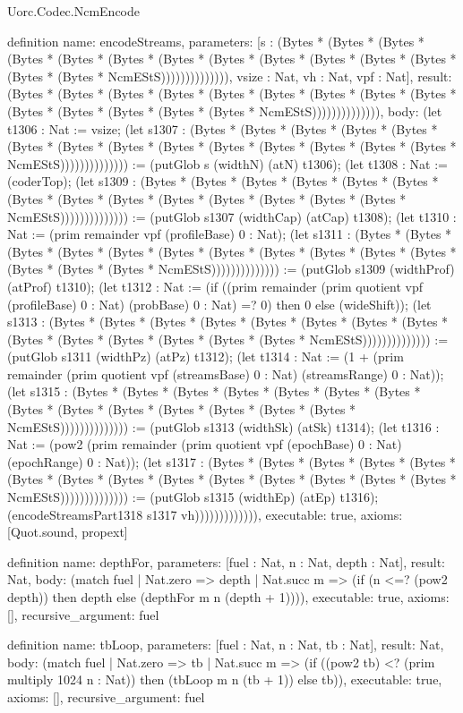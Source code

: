 \begin{lexlean}{Uorc.Codec.NcmEncode}
\begin{semanticmodule}
definition{
  name: encodeStreams,
  parameters: [s : (Bytes * (Bytes * (Bytes * (Bytes * (Bytes * (Bytes * (Bytes * (Bytes * (Bytes * (Bytes * (Bytes * (Bytes * (Bytes * (Bytes * NcmEStS)))))))))))))), vsize : Nat, vh : Nat, vpf : Nat],
  result: (Bytes * (Bytes * (Bytes * (Bytes * (Bytes * (Bytes * (Bytes * (Bytes * (Bytes * (Bytes * (Bytes * (Bytes * (Bytes * (Bytes * NcmEStS)))))))))))))),
  body: (let t1306 : Nat := vsize; (let s1307 : (Bytes * (Bytes * (Bytes * (Bytes * (Bytes * (Bytes * (Bytes * (Bytes * (Bytes * (Bytes * (Bytes * (Bytes * (Bytes * (Bytes * NcmEStS)))))))))))))) := (putGlob s (widthN) (atN) t1306); (let t1308 : Nat := (coderTop); (let s1309 : (Bytes * (Bytes * (Bytes * (Bytes * (Bytes * (Bytes * (Bytes * (Bytes * (Bytes * (Bytes * (Bytes * (Bytes * (Bytes * (Bytes * NcmEStS)))))))))))))) := (putGlob s1307 (widthCap) (atCap) t1308); (let t1310 : Nat := (prim remainder vpf (profileBase) 0 : Nat); (let s1311 : (Bytes * (Bytes * (Bytes * (Bytes * (Bytes * (Bytes * (Bytes * (Bytes * (Bytes * (Bytes * (Bytes * (Bytes * (Bytes * (Bytes * NcmEStS)))))))))))))) := (putGlob s1309 (widthProf) (atProf) t1310); (let t1312 : Nat := (if ((prim remainder (prim quotient vpf (profileBase) 0 : Nat) (probBase) 0 : Nat) =? 0) then 0 else (wideShift)); (let s1313 : (Bytes * (Bytes * (Bytes * (Bytes * (Bytes * (Bytes * (Bytes * (Bytes * (Bytes * (Bytes * (Bytes * (Bytes * (Bytes * (Bytes * NcmEStS)))))))))))))) := (putGlob s1311 (widthPz) (atPz) t1312); (let t1314 : Nat := (1 + (prim remainder (prim quotient vpf (streamsBase) 0 : Nat) (streamsRange) 0 : Nat)); (let s1315 : (Bytes * (Bytes * (Bytes * (Bytes * (Bytes * (Bytes * (Bytes * (Bytes * (Bytes * (Bytes * (Bytes * (Bytes * (Bytes * (Bytes * NcmEStS)))))))))))))) := (putGlob s1313 (widthSk) (atSk) t1314); (let t1316 : Nat := (pow2 (prim remainder (prim quotient vpf (epochBase) 0 : Nat) (epochRange) 0 : Nat)); (let s1317 : (Bytes * (Bytes * (Bytes * (Bytes * (Bytes * (Bytes * (Bytes * (Bytes * (Bytes * (Bytes * (Bytes * (Bytes * (Bytes * (Bytes * NcmEStS)))))))))))))) := (putGlob s1315 (widthEp) (atEp) t1316); (encodeStreamsPart1318 s1317 vh))))))))))))),
  executable: true,
  axioms: [Quot.sound, propext]
}

definition{
  name: depthFor,
  parameters: [fuel : Nat, n : Nat, depth : Nat],
  result: Nat,
  body: (match fuel
    | Nat.zero => depth
    | Nat.succ m => (if (n <=? (pow2 depth)) then depth else (depthFor m n (depth + 1)))),
  executable: true,
  axioms: [],
  recursive_argument: fuel
}

definition{
  name: tbLoop,
  parameters: [fuel : Nat, n : Nat, tb : Nat],
  result: Nat,
  body: (match fuel
    | Nat.zero => tb
    | Nat.succ m => (if ((pow2 tb) <? (prim multiply 1024 n : Nat)) then (tbLoop m n (tb + 1)) else tb)),
  executable: true,
  axioms: [],
  recursive_argument: fuel
}


\end{semanticmodule}
\end{lexlean}
